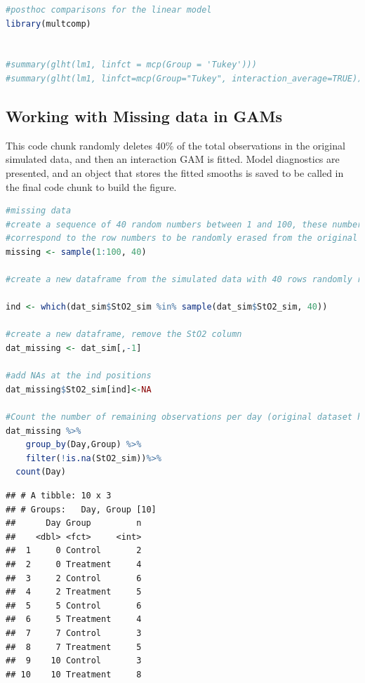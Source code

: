 \documentclass[
]{article}
\begin{document}
\begin{lstlisting}[language=R]
#posthoc comparisons for the linear model
library(multcomp)


#summary(glht(lm1, linfct = mcp(Group = 'Tukey')))
#summary(glht(lm1, linfct=mcp(Group="Tukey", interaction_average=TRUE)))
\end{lstlisting}

\hypertarget{working-with-missing-data-in-gams}{%
\subsection{Working with Missing data in GAMs}\label{working-with-missing-data-in-gams}}

This code chunk randomly deletes 40\% of the total observations in the original simulated data, and then an interaction GAM is fitted. Model diagnostics are presented, and an object that stores the fitted smooths is saved to be called in the final code chunk to build the figure.

\begin{lstlisting}[language=R]
#missing data
#create a sequence of 40 random numbers between 1 and 100, these numbers will
#correspond to the row numbers to be randomly erased from the original dataset
missing <- sample(1:100, 40)

#create a new dataframe from the simulated data with 40 rows randomly removed, keep the missing values as NA

ind <- which(dat_sim$StO2_sim %in% sample(dat_sim$StO2_sim, 40))

#create a new dataframe, remove the StO2 column
dat_missing <- dat_sim[,-1]

#add NAs at the ind positions
dat_missing$StO2_sim[ind]<-NA 

#Count the number of remaining observations per day (original dataset had 10 per group per day)
dat_missing %>%
    group_by(Day,Group) %>%
    filter(!is.na(StO2_sim))%>%
  count(Day)
\end{lstlisting}

\begin{lstlisting}
## # A tibble: 10 x 3
## # Groups:   Day, Group [10]
##      Day Group         n
##    <dbl> <fct>     <int>
##  1     0 Control       2
##  2     0 Treatment     4
##  3     2 Control       6
##  4     2 Treatment     5
##  5     5 Control       6
##  6     5 Treatment     4
##  7     7 Control       3
##  8     7 Treatment     5
##  9    10 Control       3
## 10    10 Treatment     8
\end{lstlisting}
\end{document}
